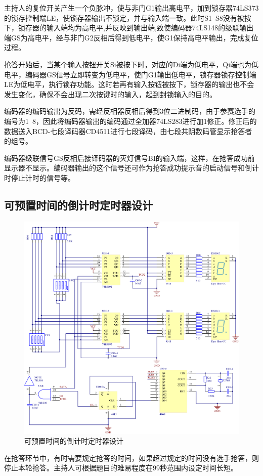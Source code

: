 \documentclass{../source/Experiment}
\begin{document}
            主持人的复位开关产生一个负脉冲，使与非门G1输出高电平，加到锁存器74LS373的锁存控制端LE，使锁存器输出不锁定，并与输入端一致。此时S1~S8没有被按下，锁存器的输入端均为高电平,并反映到输出端,致使编码器74LS148的级联输出端GS为高电平，经与非门G2反相后得到低电平，使G1保持高电平输出，完成复位过程。

            抢答开始后，当某个输入按钮开关Si被按下时，对应的Di端为低电平，Qi端也为低电平，编码器GS信号立即转变为低电平，使门G1输出低电平，锁存器锁存控制端LE为低电平，执行锁存功能。这时若再有输入按钮被按下，锁存器的输出也不会发生变化，确保不会出现二次按键时的输入，起到封锁输入的目的。

            编码器的编码输出为反码，需经反相器反相后得到3位二进制码，由于参赛选手的编号为1~8，因此将编码器输出的编码通过全加器74LS283进行加1修正。修正后的数据送入BCD-七段译码器CD4511进行七段译码，由七段共阴数码管显示抢答者的组号。

            编码器级联信号GS反相后接译码器的灭灯信号BI的输入端，这样，在抢答成功前显示器不显示。编码器输出的这个信号还可作为抢答成功提示音的启动信号和倒计时停止计时的信号等。

        \subsection{可预置时间的倒计时定时器设计}
            \begin{figure}[H]
                \centering
                \includegraphics[width = 1\textwidth]{pic/P00.png}
                \caption{可预置时间的倒计时定时器设计}
            \end{figure}
            在抢答环节中，有时需要规定抢答的时间，如果超过规定的时间没有选手抢答，则停止本轮抢答。主持人可根据题目的难易程度在99秒范围内设定时间长短。
\end{document}
